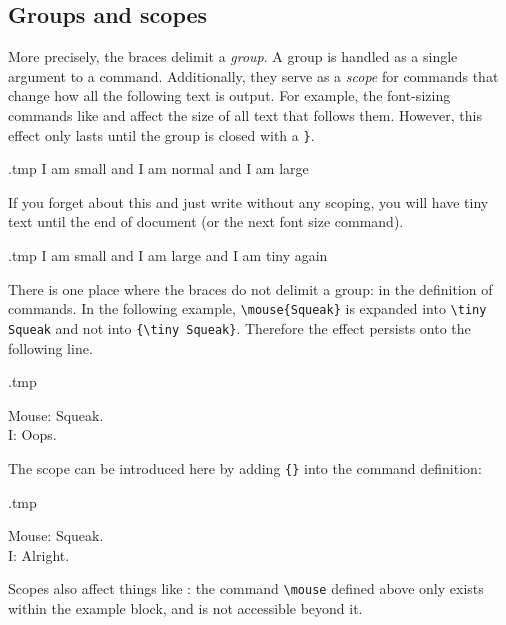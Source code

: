 %
\subsection{Groups and scopes}

\label{ex:font scope}
More precisely, the braces delimit a \emph{group}.
A group is handled as a single argument to a command.
Additionally, they serve as a \emph{scope} for commands that change
how all the following text is output.
For example, the font-sizing commands like  and 
affect the size of all text that follows them.
However, this effect only lasts until the group is closed with a \verb|}|.

\begin{VerbatimOut}{\jobname.tmp}
{\tiny I am small}
and I am normal
and {\Large I am large}
\end{VerbatimOut}
\ShowExample

If you forget about this and just write  without any scoping,
you will have tiny text until the end of document (or the next font size command).

\begin{VerbatimOut}{\jobname.tmp}
\tiny I am small and
{\Large I am large}
and I am tiny again
\end{VerbatimOut}
\ShowExample

There is one place where the braces do not delimit a group:
in the definition of commands.
In the following example, \verb|\mouse{Squeak}| is expanded into
\verb|\tiny Squeak| and not into \verb|{\tiny Squeak}|.
Therefore the effect persists onto the following line.
%
\begin{VerbatimOut}{\jobname.tmp}
\newcommand{\mouse}[1]{Mouse: \tiny#1.}

\mouse{Squeak}\\
I: Oops.
\end{VerbatimOut}
\ShowExample
%
The scope can be introduced here by adding \verb|{}| into the command definition:
%
\begin{VerbatimOut}{\jobname.tmp}
\newcommand{\mouse}[1]{{Mouse: \tiny#1.}}

\mouse{Squeak}\\
I: Alright.
\end{VerbatimOut}
\ShowExample

Scopes also affect things like :
the command \verb|\mouse| defined above only exists
within the example block, and is not accessible beyond it.



